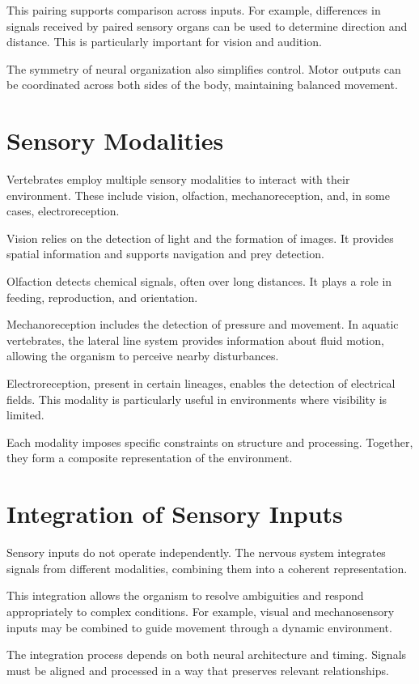\documentclass[11pt,oneside]{book}
\begin{document}
This pairing supports comparison across inputs. For example, differences in signals received by paired sensory organs can be used to determine direction and distance. This is particularly important for vision and audition.

The symmetry of neural organization also simplifies control. Motor outputs can be coordinated across both sides of the body, maintaining balanced movement.

\section{Sensory Modalities}

Vertebrates employ multiple sensory modalities to interact with their environment. These include vision, olfaction, mechanoreception, and, in some cases, electroreception.

Vision relies on the detection of light and the formation of images. It provides spatial information and supports navigation and prey detection.

Olfaction detects chemical signals, often over long distances. It plays a role in feeding, reproduction, and orientation.

Mechanoreception includes the detection of pressure and movement. In aquatic vertebrates, the lateral line system provides information about fluid motion, allowing the organism to perceive nearby disturbances.

Electroreception, present in certain lineages, enables the detection of electrical fields. This modality is particularly useful in environments where visibility is limited.

Each modality imposes specific constraints on structure and processing. Together, they form a composite representation of the environment.

\section{Integration of Sensory Inputs}

Sensory inputs do not operate independently. The nervous system integrates signals from different modalities, combining them into a coherent representation.

This integration allows the organism to resolve ambiguities and respond appropriately to complex conditions. For example, visual and mechanosensory inputs may be combined to guide movement through a dynamic environment.

The integration process depends on both neural architecture and timing. Signals must be aligned and processed in a way that preserves relevant relationships.
\end{document}
